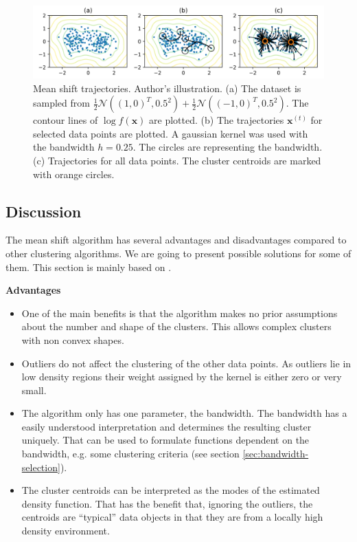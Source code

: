 \documentclass{article}
\begin{document}
\begin{figure}
	\centering
	\includegraphics[width=\textwidth]{figures/mean-shift-trajectories.png}
	\caption[Mean shift trajectories]{Mean shift trajectories. Author's illustration. (a) The dataset is sampled from $\frac{1}{2} \mathcal{N}\left((1, 0)^T, 0.5^2\right) + \frac{1}{2} \mathcal{N}\left((-1, 0)^T, 0.5^2\right)$. The contour lines of $\log \hat{f}(\bm{x})$ are plotted. (b) The trajectories $\bm{x}^{(t)}$ for selected data points are plotted. A gaussian kernel was used with the bandwidth $h=0.25$. The circles are representing the bandwidth. (c) Trajectories for all data points. The cluster centroids are marked with  orange circles.}
	\label{fig:mean-shift-trajectories}
\end{figure}



\subsection{Discussion} \label{sec:mean-shift-discussion}

The mean shift algorithm has several advantages and disadvantages compared to other clustering algorithms. We are going to present possible solutions for some of them. This section is mainly based on \cite{CarreiraPerpinan.2015}.

\textbf{Advantages}

\begin{itemize}
	\item One of the main benefits is that the algorithm makes no prior assumptions about the number and shape of the clusters. This allows complex clusters with non convex shapes.
	
	\item Outliers do not affect the clustering of the other data points. As outliers lie in low density regions their weight assigned by the kernel is either zero or very small.
	
	\item The algorithm only has one parameter, the bandwidth. The bandwidth has a easily understood interpretation and determines the resulting cluster uniquely. That can be used to formulate functions dependent on the bandwidth, e.g. some clustering criteria (see section \ref{sec:bandwidth-selection}).
	
	\item The cluster centroids can be interpreted as the modes of the estimated density function. That has the benefit that, ignoring the outliers, the centroids are ``typical'' data objects in that they are from a locally high density environment.
\end{itemize}
\end{document}
